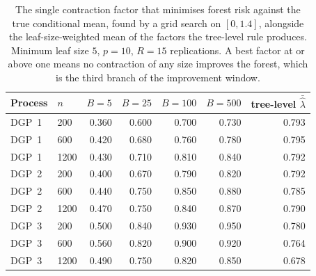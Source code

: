\begin{table}[htbp]
\centering
\caption{The single contraction factor that minimises forest risk against the true conditional mean, found by a grid search on $[0, 1.4]$, alongside the leaf-size-weighted mean of the factors the tree-level rule produces. Minimum leaf size $5$, $p=10$, $R=15$ replications. A best factor at or above one means no contraction of any size improves the forest, which is the third branch of the improvement window.}
\label{tab:level}
\small
\setlength{\tabcolsep}{4pt}
\begin{tabular}{llrrrrr}
\toprule
Process & $n$ & $B{=}5$ & $B{=}25$ & $B{=}100$ & $B{=}500$ & tree-level $\bar{\hat\lambda}$ \\
\midrule
DGP~1 & 200 & 0.360 & 0.600 & 0.700 & 0.730 & 0.793 \\
DGP~1 & 600 & 0.420 & 0.680 & 0.760 & 0.780 & 0.795 \\
DGP~1 & 1200 & 0.430 & 0.710 & 0.810 & 0.840 & 0.792 \\
\addlinespace
DGP~2 & 200 & 0.400 & 0.670 & 0.790 & 0.820 & 0.792 \\
DGP~2 & 600 & 0.440 & 0.750 & 0.850 & 0.880 & 0.785 \\
DGP~2 & 1200 & 0.470 & 0.750 & 0.840 & 0.870 & 0.790 \\
\addlinespace
DGP~3 & 200 & 0.500 & 0.840 & 0.930 & 0.950 & 0.780 \\
DGP~3 & 600 & 0.560 & 0.820 & 0.900 & 0.920 & 0.764 \\
DGP~3 & 1200 & 0.490 & 0.750 & 0.820 & 0.850 & 0.678 \\
\bottomrule
\end{tabular}
\end{table}
